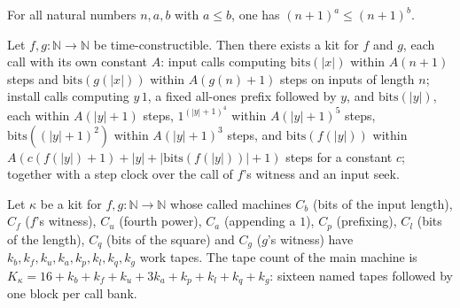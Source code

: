 \begin{theorem}
\label{Turing.NTimeDiag.qy_pow_mono}
\leanok
{}
For all natural numbers $n, a, b$ with $a \le b$, one has $(n + 1)^a \le (n + 1)^b$.
\end{theorem}

\begin{theorem}
\label{Turing.NTimeDiag.qy_kit_exists}
\leanok
{}
Let $f, g : \mathbb{N} \to \mathbb{N}$ be time-constructible. Then there exists a kit for $f$ and
$g$, each call with its own constant $A$: input calls computing $\mathrm{bits}(|x|)$ within
$A(n + 1)$ steps and $\mathrm{bits}(g(|x|))$ within $A(g(n) + 1)$ steps on inputs of length $n$;
install calls computing $y\,1$, a fixed all-ones prefix followed by $y$, and $\mathrm{bits}(|y|)$,
each within $A(|y| + 1)$ steps, $1^{(|y|+1)^4}$ within $A(|y| + 1)^5$ steps,
$\mathrm{bits}((|y|+1)^2)$ within $A(|y| + 1)^3$ steps, and $\mathrm{bits}(f(|y|))$ within
$A(c(f(|y|) + 1) + |y| + |\mathrm{bits}(f(|y|))| + 1)$ steps for a constant $c$; together with a
step clock over the call of $f$'s witness and an input seek.
\end{theorem}

\begin{definition}
\label{Turing.NTimeDiag.QyKit.K}
\leanok
{}
Let $\kappa$ be a kit for $f, g : \mathbb{N} \to \mathbb{N}$ whose called machines $C_b$ (bits of
the input length), $C_f$ ($f$'s witness), $C_u$ (fourth power), $C_a$ (appending a $1$), $C_p$
(prefixing), $C_l$ (bits of the length), $C_q$ (bits of the square) and $C_g$ ($g$'s witness) have
$k_b, k_f, k_u, k_a, k_p, k_l, k_q, k_g$ work tapes. The tape count of the main machine is
$K_\kappa = 16 + k_b + k_f + k_u + 3k_a + k_p + k_l + k_q + k_g$: sixteen named tapes followed by
one block per call bank.
\end{definition}

